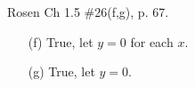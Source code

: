 \documentclass[12pt,addpoints]{exam}
\begin{document}
\begin{questions}
\question Rosen Ch 1.5 \#26(f,g), p. 67.
    \begin{solution}
    \begin{itemize}
        \item[(f)] True, let $y=0$ for each $x$.
        \item[(g)] True, let $y = 0$.
    \end{itemize}
    \end{solution}
    

\end{questions}
\end{document}
